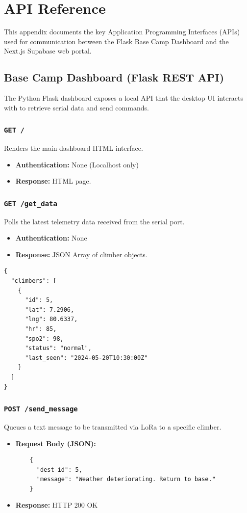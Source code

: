 \chapter{API Reference}
\label{app:api_ref}

This appendix documents the key Application Programming Interfaces (APIs) used for communication between the Flask Base Camp Dashboard and the Next.js Supabase web portal.

\section{Base Camp Dashboard (Flask REST API)}

The Python Flask dashboard exposes a local API that the desktop UI interacts with to retrieve serial data and send commands.

\subsection{\texttt{GET /}}
Renders the main dashboard HTML interface.
\begin{itemize}
    \item \textbf{Authentication:} None (Localhost only)
    \item \textbf{Response:} HTML page.
\end{itemize}

\subsection{\texttt{GET /get\_data}}
Polls the latest telemetry data received from the serial port.
\begin{itemize}
    \item \textbf{Authentication:} None
    \item \textbf{Response:} JSON Array of climber objects.
\end{itemize}
\begin{lstlisting}
{
  "climbers": [
    {
      "id": 5,
      "lat": 7.2906,
      "lng": 80.6337,
      "hr": 85,
      "spo2": 98,
      "status": "normal",
      "last_seen": "2024-05-20T10:30:00Z"
    }
  ]
}
\end{lstlisting}

\subsection{\texttt{POST /send\_message}}
Queues a text message to be transmitted via LoRa to a specific climber.
\begin{itemize}
    \item \textbf{Request Body (JSON):}
    \begin{lstlisting}
    {
      "dest_id": 5,
      "message": "Weather deteriorating. Return to base."
    }
    \end{lstlisting}
    \item \textbf{Response:} HTTP 200 OK
\end{itemize}

